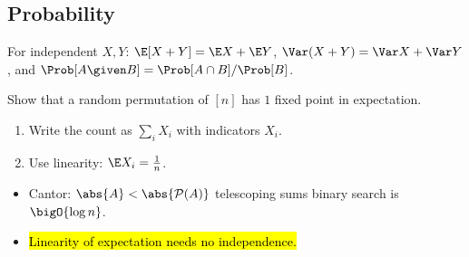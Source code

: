 \documentclass[10pt]{article}
\begin{document}
\subsection{Probability}
For independent $X, Y$: $\E[X + Y] = \E X + \E Y$, $\Var(X + Y) = \Var X + \Var Y$, and
$\Prob[A \given B] = \Prob[A \cap B] / \Prob[B]$.

\begin{exercise}
  Show that a random permutation of $[n]$ has $1$ fixed point in expectation.
  \begin{enumerate}
    \item Write the count as $\sum_i X_i$ with indicators $X_i$.
    \item Use linearity: $\E X_i = \frac1n$.
  \end{enumerate}
\end{exercise}

\begin{summary}
  \begin{itemize}
    \item Cantor: $\abs{A} < \abs{\mathcal{P}(A)}$ \quad\blossom[petal]\quad telescoping sums \quad\blossom[petal]\quad binary search is $\bigO{\log n}$.
    \item \hl{Linearity of expectation needs no independence.}
  \end{itemize}
\end{summary}
\end{document}
